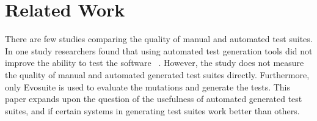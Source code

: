 \section{Related Work}
\label{sec:related_work}
There are few studies comparing the quality of manual and automated test suites. In one study researchers found that using automated test generation tools did not improve the ability to test the software ~\cite{Fraser:2013:AWT:2483760.2483774}. However, the study does not measure the quality of manual and automated generated test suites directly. Furthermore, only Evosuite is used to evaluate the mutations and generate the tests. This paper expands upon the question of the usefulness of automated generated test suites, and if certain systems in generating test suites work better than others.
